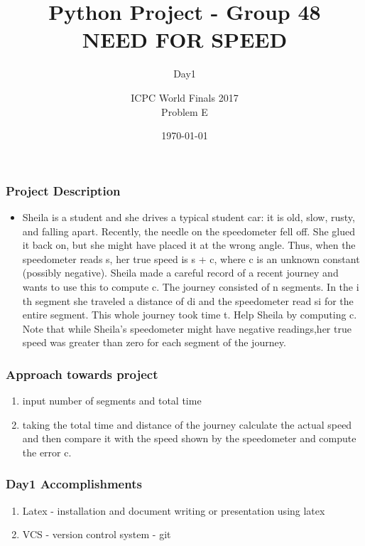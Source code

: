 \documentclass{beamer}
\title{Python Project - Group 48 \\ NEED FOR SPEED}
\subtitle{Day1}
\date{\today}
\author{ICPC World Finals 2017 \\ Problem E}
\begin{document}
    
    \begin{frame}
	    \titlepage
    \end{frame}
    
    \begin{frame}
	    \frametitle{Project Description}

	    \begin{itemize}
	    	\item Sheila is a student and she drives a typical student car: it is old, slow,
			rusty, and falling apart. Recently, the needle on the speedometer fell
			    off. She glued it back on, but she might have placed it at the wrong
			    angle. Thus, when the speedometer reads s, her true speed is s + c,
			    where c is an unknown constant (possibly negative).
			    Sheila made a careful record of a recent journey and wants to use
			    this to compute c. The journey consisted of n segments. In the i
			    th
			    segment she traveled a distance of di and the speedometer read si for
		  	    the entire segment. This whole journey took time t. Help Sheila by
		            computing c.
	                    Note that while Sheila's speedometer might have negative readings,her true speed was greater 			 than zero for each segment of the journey. 
	    \end{itemize}
   
    \end{frame}
    
    \begin{frame}
	    \frametitle{Approach towards project}
	    \begin{enumerate}
		\item input number of segments and total time
		\item taking the total time and distance of the journey calculate the actual speed and then compare it with the speed shown by the speedometer and compute the error c.
	    \end{enumerate}
    \end{frame}

    \begin{frame}
	    \frametitle{Day1 Accomplishments}
	    \begin{enumerate}
	    	\item Latex - installation and document writing or presentation using latex
		\item VCS - version control system - git
	    \end{enumerate}
    \end{frame}
\end{document}
